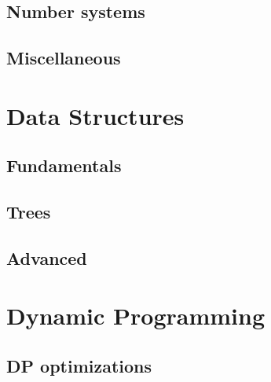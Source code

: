 \documentclass[11pt,a4paper,oneside]{book}
\let\Oldpart\part
\newcommand\parttitle{}
\renewcommand\part[1]{\Oldpart{#1}\thispagestyle{empty}\renewcommand{\parttitle}{#1}}
\begin{document}
\chapter{Number systems}


\chapter{Miscellaneous}







\part{Data Structures}
\chapter{Fundamentals}


\chapter{Trees}







\chapter{Advanced}

\part{Dynamic Programming}



\chapter{DP optimizations}


\end{document}
